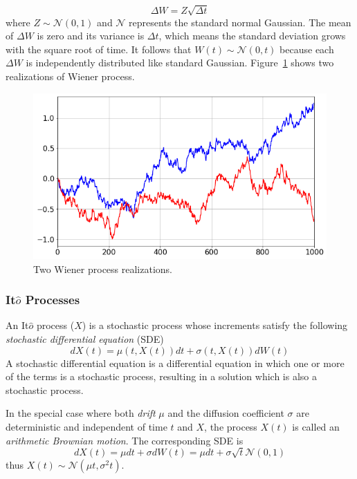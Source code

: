 \begin{equation}
\Delta W = Z\sqrt{\Delta t}
\end{equation}
where $Z ∼ \mathcal{N}(0, 1)$ and $\mathcal{N}$ represents the standard normal Gaussian. 
The mean of $\Delta W$ is zero and its variance is $\Delta t$, which means the standard deviation grows with the square root of time. It follows that $W(t) ∼ \mathcal{N}(0, t)$ because each $\Delta W$ is independently distributed like standard Gaussian. Figure~\ref{fig:wiener_process} shows two realizations of Wiener process.

\begin{figure}[htb]
	\centering
	\includegraphics[width=0.7\linewidth]{figures/wiener_process.png}
	\caption{Two Wiener process realizations.}
	\label{fig:wiener_process}
\end{figure}

\subsubsection{It$\hat{o}$ Processes} 
An It$\hat{o}$ process ($X$) is a stochastic process whose increments satisfy the following \emph{stochastic differential equation} (SDE) 
\begin{equation}
dX(t) = \mu(t, X(t)) dt + \sigma(t, X(t)) dW(t)
\end{equation}
A stochastic differential equation is a differential equation in which one or more of the terms is a stochastic process, resulting in a solution which is also a stochastic process.

In the special case where both \emph{drift} $\mu$ and the diffusion coefficient $\sigma$ are deterministic and independent of time $t$ and $X$, the process $X(t)$ is called an \emph{arithmetic Brownian motion}. The corresponding SDE is
\begin{equation}
dX(t) = \mu dt + \sigma dW(t) = \mu dt + \sigma \sqrt{t} \mathcal{N}(0,1) 
\end{equation}
thus $X(t) ∼ \mathcal{N}(\mu t, \sigma^2 t)$.

